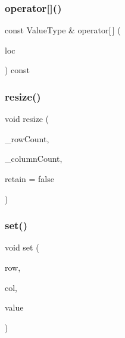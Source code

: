 \mbox{\label{classSparseGrid_a914315640e381831ab30403063205359}} 
\subsubsection{\texorpdfstring{operator[]()}{operator[]()}\hspace{0.1cm}{\footnotesize\ttfamily [4/4]}}
{\footnotesize\ttfamily const Value\+Type \& operator\mbox{[}$\,$\mbox{]} (\begin{DoxyParamCaption}\item[{const \mbox{\hyperlink{structGridLocation}{Grid\+Location}} \&}]{loc }\end{DoxyParamCaption}) const}

\mbox{\label{classSparseGrid_aa8036710a8d91046066eacbb8548b6fc}} 
\subsubsection{\texorpdfstring{resize()}{resize()}}
{\footnotesize\ttfamily void resize (\begin{DoxyParamCaption}\item[{int}]{\+\_\+row\+Count,  }\item[{int}]{\+\_\+column\+Count,  }\item[{bool}]{retain = {\ttfamily false} }\end{DoxyParamCaption})}

\mbox{\label{classSparseGrid_a6f5cee26d171f36d280a15c51332efc2}} 
\subsubsection{\texorpdfstring{set()}{set()}\hspace{0.1cm}{\footnotesize\ttfamily [1/2]}}
{\footnotesize\ttfamily void set (\begin{DoxyParamCaption}\item[{int}]{row,  }\item[{int}]{col,  }\item[{const Value\+Type \&}]{value }\end{DoxyParamCaption})}

